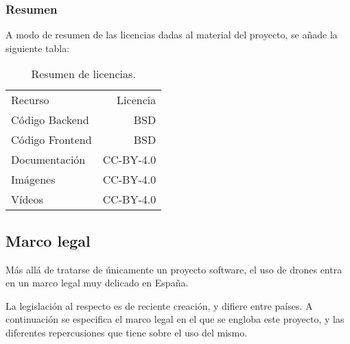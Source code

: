 \subsubsection{Resumen}

A modo de resumen de las licencias dadas al material del proyecto, se añade la siguiente tabla: 

\begin{table}[H]
\begin{center}
		\begin{tabular}{l | r}\hline
			\toprule
			Recurso & Licencia\\
			\otoprule
			Código Backend &  BSD \\
			Código Frontend & BSD\\
			Documentación &  CC-BY-4.0\\
			Imágenes & CC-BY-4.0\\
			Vídeos & CC-BY-4.0\\
			\hline
			\bottomrule
		\end{tabular}
		\caption{Resumen de licencias.}
		\label{tb:licenseabstract}
		\end{center}
\end{table}

\subsection{Marco legal}

Más allá de tratarse de únicamente un proyecto software, el uso de drones entra en un marco legal muy delicado en España. 

La legislación al respecto es de reciente creación, y difiere entre países. A continuación se especifica el marco legal en el que se engloba este proyecto, y las diferentes repercusiones que tiene sobre el uso del mismo.

